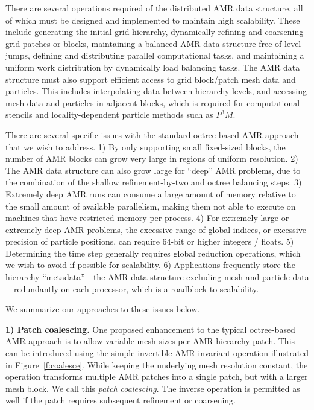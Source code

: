 \documentclass[10pt,twocolumn]{article}
\begin{document}
There are several operations required of the distributed AMR data
structure, all of which must be designed and implemented to maintain
high scalability.  These include generating the initial grid
hierarchy, dynamically refining and coarsening grid patches or blocks,
maintaining a balanced AMR data structure free of level jumps,
defining and distributing parallel computational tasks, and
maintaining a uniform work distribution by dynamically load balancing
tasks.  The AMR data structure must also support efficient access to
grid block/patch mesh data and particles.  This includes interpolating
data between hierarchy levels, and accessing mesh data and particles
in adjacent blocks, which is required for computational stencils and
locality-dependent particle methods such as $P^3M$.

There are several specific issues with the standard octree-based AMR
approach that we wish to address.
%
1) By only supporting small fixed-sized blocks, the number of AMR blocks
can grow very large in regions of uniform resolution.
%
2) The AMR data structure can also grow large for ``deep'' AMR
problems, due to the combination of the shallow refinement-by-two and
octree balancing steps.
%
3) Extremely deep AMR runs can consume a large amount of memory
relative to the small amount of available parallelism, making them not
able to execute on machines that have restricted memory per process.
%
4) For extremely large or extremely deep AMR problems, the excessive
range of global indices, or excessive precision of particle positions,
can require 64-bit or higher integers / floats.
%
5) Determining the time step generally requires global reduction
operations, which we wish to avoid if possible for scalability.
%
6) Applications frequently store the hierarchy ``metadata''---the AMR
data structure excluding mesh and particle data---redundantly on each
processor, which is a roadblock to scalability.

We summarize our approaches to these issues below.


\textbf{1) Patch coalescing.} One proposed enhancement to the typical
octree-based AMR approach is to allow variable mesh sizes per AMR
hierarchy patch.  This can be introduced using the simple invertible
AMR-invariant operation illustrated in Figure~\ref{f:coalesce}.  While
keeping the underlying mesh resolution constant, the operation
transforms multiple AMR patches into a single patch, but with a larger
mesh block.  We call this \textit{patch coalescing}.  The inverse
operation is permitted as well if the patch requires subsequent
refinement or coarsening.
\end{document}
